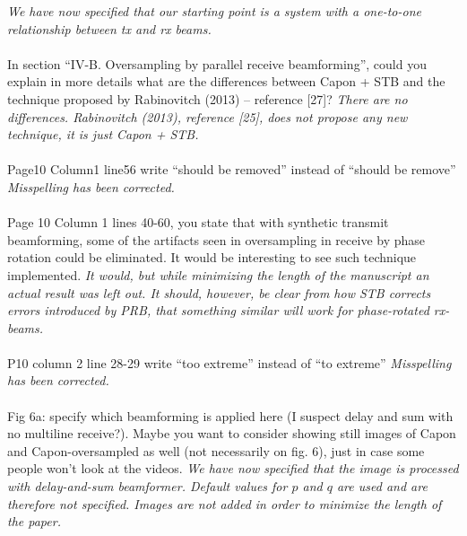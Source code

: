 \documentclass{article}
\begin{document}
\textit{We have now specified that our starting point is a system with a one-to-one relationship between tx and rx beams.}
\\\\
In section “IV-B. Oversampling by parallel receive beamforming”, could you explain in more details what are the differences between Capon + STB and the technique proposed by Rabinovitch (2013) – reference [27]?
\textit{There are no differences. Rabinovitch (2013), reference [25], does not propose any new technique, it is just Capon + STB.}
\\\\
Page10 Column1 line56  write “should be removed” instead of “should be remove”
\textit{Misspelling has been corrected.}
\\\\
Page 10 Column 1 lines 40-60, you state that with synthetic transmit beamforming, some of the artifacts seen in oversampling in receive by phase rotation could be eliminated. It would be interesting to see such technique implemented.
\textit{It would, but while minimizing the length of the manuscript an actual result was left out. It should, however, be clear from how STB corrects errors introduced by PRB, that something similar will work for phase-rotated rx-beams.}
\\\\
P10 column 2 line 28-29 write “too extreme” instead of “to extreme”
\textit{Misspelling has been corrected.}
\\\\
Fig 6a: specify which beamforming is applied here (I suspect delay and sum with no multiline receive?). Maybe you want to consider showing still images of Capon and Capon-oversampled as well (not necessarily on fig. 6), just in case some people won’t look at the videos.
\textit{We have now specified that the image is processed with delay-and-sum beamformer. Default values for $p$ and $q$ are used and are therefore not specified. Images are not added in order to minimize the length of the paper.}
\end{document}
